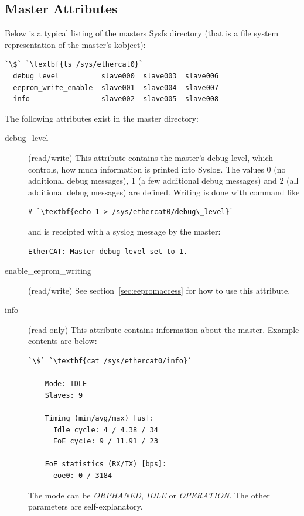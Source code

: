 \documentclass[a4paper,12pt,BCOR6mm,bibtotoc,idxtotoc]{scrbook}
\begin{document}
\subsection{Master Attributes}
\label{sec:sysfs-master}

Below is a typical listing of the masters Sysfs directory (that is a
file system representation of the master's kobject):

\begin{lstlisting}[gobble=2]
  `\$` `\textbf{ls /sys/ethercat0}`
  debug_level          slave000  slave003  slave006
  eeprom_write_enable  slave001  slave004  slave007
  info                 slave002  slave005  slave008
\end{lstlisting}

The following attributes exist in the master directory:

\begin{description}
\item[debug\_level] (read/write) This attribute contains the master's
  debug level, which controls, how much information is printed into
  Syslog. The values 0 (no additional debug messages), 1 (a few
  additional debug messages) and 2 (all additional debug messages) are
  defined. Writing is done with command like

  \begin{lstlisting}[gobble=4]
    # `\textbf{echo 1 > /sys/ethercat0/debug\_level}`
  \end{lstlisting}

  and is receipted with a syslog message by the master:

  \begin{lstlisting}[gobble=4]
    EtherCAT: Master debug level set to 1.
  \end{lstlisting}

\item[enable\_eeprom\_writing] (read/write) See
  section~\ref{sec:eepromaccess} for how to use this attribute.

\item[info] (read only) This attribute contains information about the
  master. Example contents are below:

  \begin{lstlisting}[gobble=4]
    `\$` `\textbf{cat /sys/ethercat0/info}`

    Mode: IDLE
    Slaves: 9

    Timing (min/avg/max) [us]:
      Idle cycle: 4 / 4.38 / 34
      EoE cycle: 9 / 11.91 / 23

    EoE statistics (RX/TX) [bps]:
      eoe0: 0 / 3184
  \end{lstlisting}

  The mode can be \textit{ORPHANED}, \textit{IDLE} or
  \textit{OPERATION}. The other parameters are self-explanatory.

\end{description}
\end{document}
